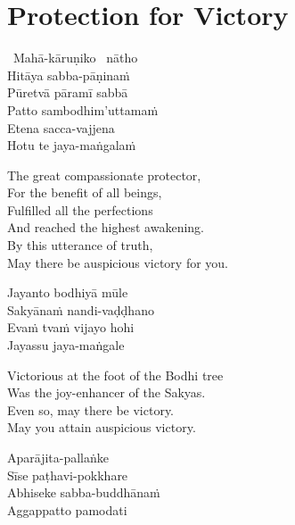 \suttaRef{[Trad]}



\section{Protection for Victory}
\label{protection-for-victory}

\begin{pali-hang-together}
  \anglebracketleft\ \hspace{-0.5mm}Mahā-kāruṇiko \hspace{-0.5mm}\anglebracketright\ nātho\\
  Hitāya sabba-pāṇinaṁ\\
  Pūretvā pāramī sabbā\\
  Patto sambodhim'uttamaṁ\\
  Etena sacca-vajjena\\
  Hotu te jaya-maṅgalaṁ
\end{pali-hang-together}

\begin{english-verses}
  The great compassionate protector,\\
  For the benefit of all beings,\\
  Fulfilled all the perfections\\
  And reached the highest awakening.\\
  By this utterance of truth,\\
  May there be auspicious victory for you.
\end{english-verses}

\begin{pali-hang-continued}
  Jayanto bodhiyā mūle\\
  Sakyānaṁ nandi-vaḍḍhano\\
  Evaṁ tvaṁ vijayo hohi\\
  Jayassu jaya-maṅgale
\end{pali-hang-continued}

\begin{english-verses}
  Victorious at the foot of the Bodhi tree\\
  Was the joy-enhancer of the Sakyas.\\
  Even so, may there be victory.\\
  May you attain auspicious victory.
\end{english-verses}

\begin{pali-hang-continued}
  Aparājita-pallaṅke\\
  Sīse paṭhavi-pokkhare\\
  \ifbfive\enlargethispage{1\baselineskip}\fi
  Abhiseke sabba-buddhānaṁ\\
  Aggappatto pamodati
\end{pali-hang-continued}

